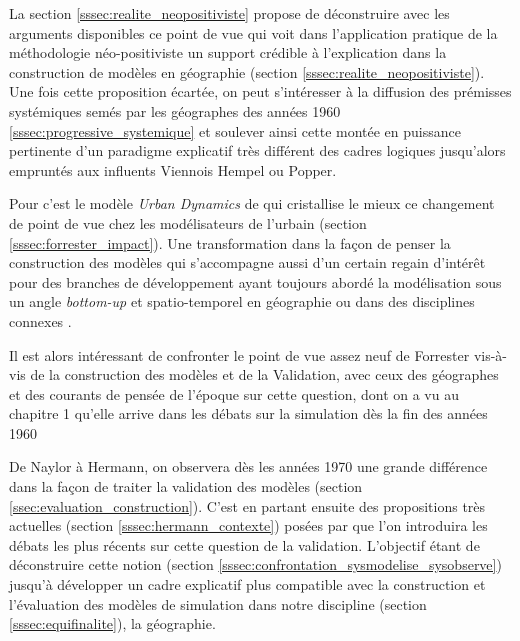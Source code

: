 La section \ref{sssec:realite_neopositiviste} propose de déconstruire avec les arguments disponibles ce point de vue qui voit dans l'application pratique de la méthodologie néo-positiviste un support crédible à l'explication dans la construction de modèles en géographie (section \ref{sssec:realite_neopositiviste}). Une fois cette proposition écartée, on peut s'intéresser à la diffusion des prémisses systémiques \autocites{Chorley1962, Berry1964a, Haggett1965,Harvey1969} semés par les géographes des années 1960 \ref{sssec:progressive_systemique} et soulever ainsi cette montée en puissance pertinente d'un paradigme explicatif très différent \autocite{Besse2000} des cadres logiques jusqu'alors empruntés aux influents Viennois Hempel ou Popper.



Pour \textcites{Batty2001, Batty2005b} c'est le modèle \textit{Urban Dynamics} de \textcite{Forrester1969} qui cristallise le mieux ce changement de point de vue chez les modélisateurs de l'urbain (section \ref{sssec:forrester_impact}). Une transformation dans la façon de penser la construction des modèles qui s'accompagne aussi d'un certain regain d'intérêt \autocite{Batty1976} pour des branches de développement ayant toujours abordé la modélisation sous un angle \textit{bottom-up} et spatio-temporel en géographie \autocites{Hagerstrand1952, Hagerstrand1967, Morrill1965, Morrill1965b, Marble1972, Ward1973}  ou dans des disciplines connexes \autocite{Orcutt1957}.

Il est alors intéressant de confronter le point de vue assez neuf de Forrester vis-à-vis de la construction des modèles et de la Validation, avec ceux des géographes et des courants de pensée de l'époque sur cette question, dont on a vu au chapitre 1 qu'elle arrive dans les débats sur la simulation dès la fin des années 1960 \autocites{Naylor1967, Hermann1967, Dutton1971, Guetzkow1962, Guetzkow1972}

De Naylor à Hermann, on observera dès les années 1970 une grande différence dans la façon de traiter la validation des modèles (section \ref{ssec:evaluation_construction}). C'est en partant ensuite des propositions très actuelles (section \ref{sssec:hermann_contexte}) posées par \textcite{Hermann1967} que l'on introduira les débats les plus récents sur cette question de la validation. L'objectif étant de déconstruire cette notion (section \ref{sssec:confrontation_sysmodelise_sysobserve}) jusqu'à développer un cadre explicatif plus compatible avec la construction et l'évaluation des modèles de simulation dans notre discipline (section \ref{sssec:equifinalite}), la géographie.

